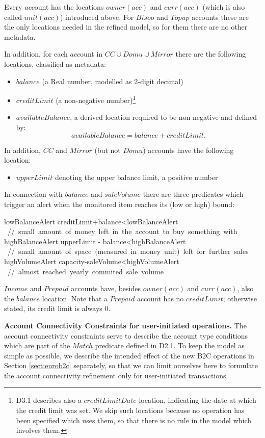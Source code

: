 Every $acc$ount has the locations $owner(acc)$ and $curr(acc)$ (which is also called $unit(acc)$) introduced above. For $Bisoo$ and $Topup$ accounts these are the only locations needed in the refined model, so for them there are no other metadata. 

In addition, for each $acc$ount in $CC \cup Domu \cup Mirror$ there are the following locations, classified as metadata:

\begin{itemize}
	\item $balance$ (a Real number, modelled as 2-digit decimal)
	
	\item $creditLimit$ (a non-negative number)\footnote{D3.1 describes also a $creditLimitDate$ location, indicating the date at which the credit limit was set. We skip such locations because no operation has been specified which uses them, so that there is no rule in the model which involves them.}
	
	\item $availableBalance$, a derived location required to be non-negative and defined by:
	\[availableBalance=balance+creditLimit.\]
\end{itemize}

In addition, $CC$ and $Mirror$ (but not $Domu$) accounts have the following  location:
\begin{itemize}
\item $upperLimit$ denoting the upper balance limit, a positive number
\end{itemize}
In connection with $balance$ and $saleVolume$ there are three predicates which trigger an alert when the monitored item reaches its (low or high) bound:
\begin{asm}
lowBalanceAlert \IFF creditLimit+balance<lowBalanceAlert \+
   \mbox{ // small amount of money left in the account to buy something with}\-
highBalanceAlert \IFF upperLimit - balance<highBalanceAlert \+
        \mbox{ // small amount of space (measured in money unit) left for further sales}\-
highVolumeAlert \IFF capacity-saleVolume<highVolumeAlert \+
           \mbox{ // almost reached yearly commited sale volume}
\end{asm}

$Income$ and $Prepaid$ accounts have, besides  $owner(acc)$ and $curr(acc)$, also the $balance$ location. Note that a $Prepaid$ account has no $creditLimit$; otherwise stated, its credit limit is always 0.


{\bf Account Connectivity Constraints for user-initiated operations.} The account connectivity constraints serve to describe the account type conditions which are part 
of the $Match$ predicate defined in D2.1. To keep the model as simple as possible, 
we describe the intended effect of the new B2C operations in Section \ref{sect:eurob2c} separately, so that we can limit ourselves here to formulate the account connectivity refinement only for user-initiated transactions.


